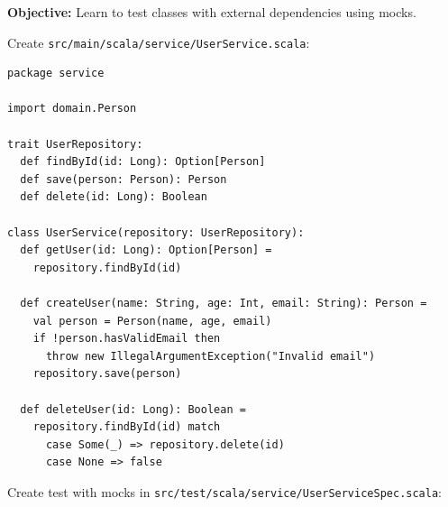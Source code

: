 \documentclass[12pt,a4paper]{article}
\begin{document}
\textbf{Objective:} Learn to test classes with external dependencies using mocks.

Create \texttt{src/main/scala/service/UserService.scala}:

\begin{lstlisting}
package service

import domain.Person

trait UserRepository:
  def findById(id: Long): Option[Person]
  def save(person: Person): Person
  def delete(id: Long): Boolean

class UserService(repository: UserRepository):
  def getUser(id: Long): Option[Person] = 
    repository.findById(id)
  
  def createUser(name: String, age: Int, email: String): Person = 
    val person = Person(name, age, email)
    if !person.hasValidEmail then
      throw new IllegalArgumentException("Invalid email")
    repository.save(person)
  
  def deleteUser(id: Long): Boolean = 
    repository.findById(id) match
      case Some(_) => repository.delete(id)
      case None => false
\end{lstlisting}

Create test with mocks in \texttt{src/test/scala/service/UserServiceSpec.scala}:
\end{document}
